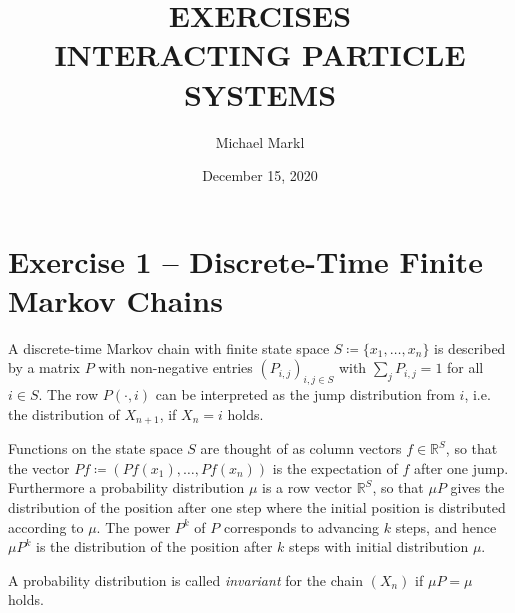 \documentclass[a4paper]{amsart}
\title{EXERCISES\\
{\footnotesize INTERACTING PARTICLE SYSTEMS}}
\author{Michael Markl}
\date{December 15, 2020}
\theoremstyle{theorem}
\theoremstyle{definition}
\newcommand{\R}{\mathbb{R}}
\begin{document}
\pagestyle{plain}
\maketitle

\section*{Exercise 1 -- Discrete-Time Finite Markov Chains}

A discrete-time Markov chain with finite state space $S\coloneqq \{ x_1, \dots, x_n \}$ is described by a matrix $P$ with non-negative entries $(P_{i,j})_{i,j\in S}$ with $\sum_{j} P_{i,j} = 1$ for all $i\in S$.
The row $P(\cdot, i)$ can be interpreted as the jump distribution from $i$, i.e. the distribution of $X_{n+1}$, if $X_n = i$ holds.

Functions on the state space $S$ are thought of as column vectors $f\in \R^S$, so that the vector $Pf \coloneqq (Pf(x_1), \dots, Pf(x_n))$ is the expectation of $f$ after one jump.
Furthermore a probability distribution $\mu$ is a row vector $\R^S$, so that $\mu P$ gives the distribution of the position after one step where the initial position is distributed according to $\mu$.
The power $P^k$ of $P$ corresponds to advancing $k$ steps, and hence $\mu P^k$ is the distribution of the position after $k$ steps with initial distribution $\mu$.

A probability distribution is called \emph{invariant} for the chain $(X_n)$ if $\mu P = \mu$ holds.
\medskip
\end{document}
